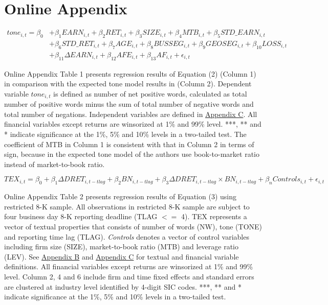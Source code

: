 \section{Online Appendix}


\setcounter{equation}{1}
\begin{equation}
\begin{split}
tone_{i,t}=\beta_0&+\beta_1EARN_{i,t}+\beta_2RET_{i,t}+\beta_3SIZE_{i,t}+\beta_4MTB_{i,t}+\beta_5STD\_EARN_{i,t}\\
&+\beta_6STD\_RET_{i,t}+\beta_7AGE_{i,t}+\beta_8BUSSEG_{i,t}+\beta_9GEOSEG_{i,t}+\beta_{10}LOSS_{i,t}\\
&+\beta_{11}\Delta EARN_{i,t}+\beta_{12}AFE_{i,t}+\beta_{13}AF_{i,t}+\epsilon_{i,t}
\end{split}
\end{equation}

Online Appendix Table 1 presents regression results of Equation (2) (Column 1) in comparison with the expected tone model results in \cite{huangToneManagement2014} (Column 2). Dependent variable $tone_{i,t}$ is defined as number of net positive words, calculated as total number of positive words minus the sum of total number of negative words and total number of negations. Independent variables are defined in \hyperref[appc]{Appendix C}. All financial variables except returns are winsorized at 1\% and 99\% level. ***, ** and * indicate significance at the 1\%, 5\% and 10\% levels in a two-tailed test. The coefficient of MTB in Column 1 is consistent with that in Column 2 in terms of sign, because in the expected tone model of \cite{huangToneManagement2014} the authors use book-to-market ratio instead of market-to-book ratio. 


\newpage

\setcounter{equation}{2}
\begin{equation}
TEX_{i,t}=\beta_0+\beta_1\Delta DRET_{i,t-tlag}+\beta_2BN_{i,t-tlag}+\beta_3\Delta DRET_{i,t-tlag}\times BN_{i,t-tlag}+\beta_nControls_{i,t}+\epsilon_{i,t}
\end{equation}

Online Appendix Table 2 presents regression results of Equation (3) using restricted 8-K sample. All observations in restricted 8-K sample are subject to four business day 8-K reporting deadline (TLAG $<=$ 4). TEX represents a vector of textual properties that consists of number of words (NW), tone (TONE) and reporting time lag (TLAG). \textit{Controls} denotes a vector of control variables including firm size (SIZE), market-to-book ratio (MTB) and leverage ratio (LEV). See \hyperref[appb]{Appendix B} and \hyperref[appc]{Appendix C} for textual and financial variable definitions. All financial variables except returns are winsorized at 1\% and 99\% level. Column 2, 4 and 6 include firm and time fixed effects and standard errors are clustered at industry level identified by 4-digit SIC codes. ***, ** and * indicate significance at the 1\%, 5\% and 10\% levels in a two-tailed test.
